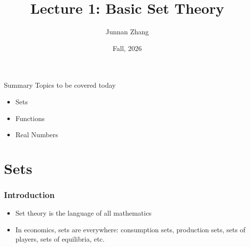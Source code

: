 \documentclass[9pt,aspectratio=169]{beamer}
\title[Lecture 1: Basic Set Theory]{Lecture 1: Basic Set Theory}
\author{Junnan Zhang} %
\institute[Paula and Gregory Chow Institute for Studies in Economics\\
Xiamen University] %
{
	Paula and Gregory Chow Institute for Studies in Economics \\ Xiamen University  \\ %
	\medskip
}
\date{Fall, 2026} %
\begin{document}
\begin{frame}
    \titlepage
\end{frame}

\begin{frame}{Summary}
    Topics to be covered today
    \begin{itemize}
        \item Sets
        \item Functions
        \item Real Numbers
    \end{itemize}
\end{frame}

\section{Sets}

\begin{frame}
    \frametitle{Introduction}
    \begin{itemize}
        \item Set theory is the language of all mathematics
        \item In economics, sets are everywhere: consumption sets, production
        sets, sets of players, sets of equilibria, etc.
    \end{itemize}
\end{frame}
\end{document}
